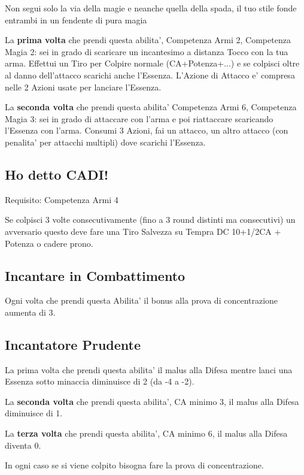\documentclass[a4paper,11pt,twoside,openany]{book}
\begin{document}
	Non segui solo la via della magie e neanche quella della spada, il tuo stile fonde entrambi in un fendente di pura magia
	
	La \textbf{prima volta} che prendi questa abilita', Competenza Armi 2, Competenza Magia 2: sei in grado di scaricare un incantesimo a distanza Tocco con la tua arma. Effettui un Tiro per Colpire normale (CA+Potenza+...) e se colpisci oltre al danno dell'attacco scarichi anche l'Essenza. L'Azione di Attacco e' compresa nelle 2 Azioni usate per lanciare l'Essenza.
	
	La \textbf{seconda volta} che prendi questa abilita' Competenza Armi 6, Competenza Magia 3: sei in grado di attaccare con l'arma e poi riattaccare scaricando l'Essenza con l'arma. Consumi 3 Azioni, fai un attacco, un altro attacco (con penalita' per attacchi multipli) dove scarichi l'Essenza.
	
	\subsection{Ho detto CADI!}
	
	Requisito: Competenza Armi 4
	
	Se colpisci 3 volte consecutivamente (fino a 3 round distinti ma consecutivi) un avversario questo deve fare una Tiro Salvezza su Tempra DC 10+1/2CA + Potenza o cadere prono.
	
	\subsection{Incantare in Combattimento}
	
	Ogni volta che prendi questa Abilita' il bonus alla prova di concentrazione aumenta di 3.
	
	\subsection{Incantatore Prudente}
	
	La prima volta che prendi questa abilita' il malus alla Difesa mentre lanci una Essenza sotto minaccia diminuisce di 2 (da -4 a -2).
	
	La \textbf{seconda volta} che prendi questa abilita', CA minimo 3, il malus alla Difesa diminuisce di 1.
	
	La \textbf{terza volta} che prendi questa abilita', CA minimo 6, il malus alla Difesa diventa 0.
	
	In ogni caso se si viene colpito bisogna fare la prova di concentrazione.
	
\end{document}
